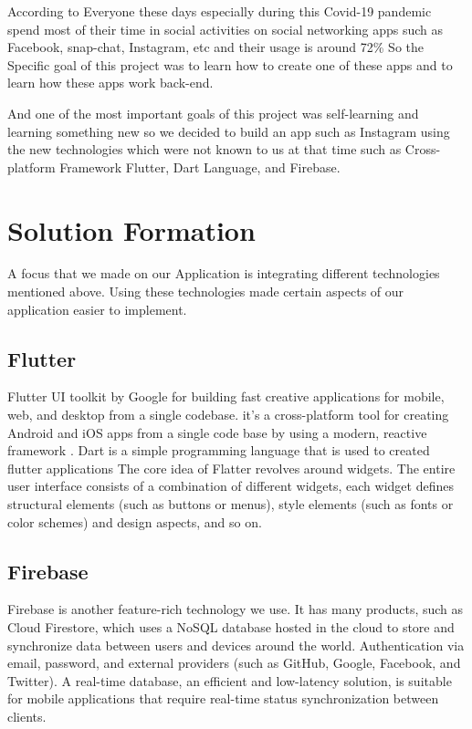 According to \cite{COVID19-SocialMediaUsage:online} Everyone these days especially during this Covid-19 pandemic spend most of their time in social activities on social networking apps such as Facebook, snap-chat, Instagram, etc and their usage is around 72\%  So the Specific goal of this project was to learn how to create one of these apps and to learn how these apps work back-end.

And one of the most important goals of this project was self-learning and learning something new so we decided to build an app such as Instagram using the new technologies which were not known to us at that time such as Cross-platform Framework Flutter, Dart Language, and Firebase.
\section{Solution Formation}

A focus that we made on our Application is integrating different technologies mentioned above. Using these technologies made certain aspects of our application easier to implement.

\subsection{Flutter}

Flutter UI toolkit by Google for building fast creative applications for mobile, web, and desktop from a single codebase. it’s a cross-platform tool for creating Android and iOS apps from a single code base by using a modern, reactive framework \cite{WhatisFl74:online}. Dart is a simple programming language that is used to created flutter applications The core idea of Flatter revolves around widgets. The entire user interface consists of a combination of different widgets, each widget defines structural elements (such as buttons or menus), style elements (such as fonts or color schemes) and design aspects, and so on.
\subsection{Firebase}
Firebase is another feature-rich technology we use. It has many products, such as Cloud Firestore, which uses a NoSQL database hosted in the cloud to store and synchronize data between users and devices around the world. Authentication via email, password, and external providers (such as GitHub, Google, Facebook, and Twitter). A real-time database, an efficient and low-latency solution, is suitable for mobile applications that require real-time status synchronization between clients. 
